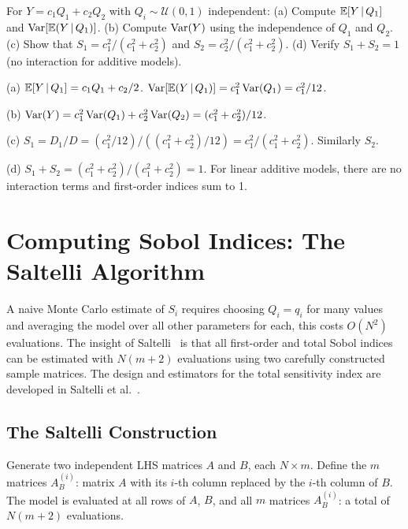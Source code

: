 \begin{selfcheck}
For $Y = c_1 Q_1 + c_2 Q_2$ with $Q_i \sim \mathcal{U}(0,1)$ independent:
(a) Compute $\mathbb{E}[Y\,|\,Q_1]$ and $\operatorname{Var}[\mathbb{E}(Y\,|\,Q_1)]$.
(b) Compute $\operatorname{Var}(Y)$ using the independence of $Q_1$ and $Q_2$.
(c) Show that $S_1 = c_1^2/(c_1^2 + c_2^2)$ and $S_2 = c_2^2/(c_1^2 + c_2^2)$.
(d) Verify $S_1 + S_2 = 1$ (no interaction for additive models).
\end{selfcheck}
\begin{scAnswer}
(a) $\mathbb{E}[Y\,|\,Q_1] = c_1 Q_1 + c_2/2$.
$\operatorname{Var}[\mathbb{E}(Y\,|\,Q_1)] = c_1^2 \operatorname{Var}(Q_1) = c_1^2/12$.

(b) $\operatorname{Var}(Y) = c_1^2\operatorname{Var}(Q_1) + c_2^2\operatorname{Var}(Q_2) = (c_1^2 + c_2^2)/12$.

(c) $S_1 = D_1/D = (c_1^2/12)/((c_1^2+c_2^2)/12) = c_1^2/(c_1^2+c_2^2)$. Similarly $S_2$.

(d) $S_1 + S_2 = (c_1^2 + c_2^2)/(c_1^2+c_2^2) = 1$. For linear additive models,
there are no interaction terms and first-order indices sum to 1.
\end{scAnswer}

\section{Computing Sobol Indices: The Saltelli Algorithm}
\label{sec:saltellialg}

A naive Monte Carlo estimate of $S_i$ requires choosing $Q_i = q_i$
for many values and averaging the model over all other parameters
for each, this costs $O(N^2)$ evaluations. The insight of Saltelli~\cite{saltelli2002making}
is that all first-order and total Sobol indices can be estimated with
$N(m+2)$ evaluations using two carefully constructed sample matrices.
The design and estimators for the total sensitivity index are developed
in Saltelli et al.~\cite{saltelli2010variance}.

\subsection{The Saltelli Construction}

Generate two independent LHS matrices $A$ and $B$, each $N\times m$.
Define the $m$ matrices $A_B^{(i)}$: matrix $A$ with its $i$-th column
replaced by the $i$-th column of $B$. The model is evaluated at all
rows of $A$, $B$, and all $m$ matrices $A_B^{(i)}$: a total of
$N(m+2)$ evaluations.

